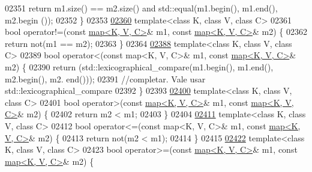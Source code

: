\begin{DoxyCode}
02351     \textcolor{keywordflow}{return} m1.size() == m2.size() and std::equal(m1.begin(), m1.end(), m2.begin
      ());
02352 \}
02353 
\hypertarget{map3_8h_source_l02360}{}\hyperlink{classaed2_1_1map_abce0fa35c5b25fd67111c2e704616f09_abce0fa35c5b25fd67111c2e704616f09}{02360} \textcolor{keyword}{template}<\textcolor{keyword}{class} K, \textcolor{keyword}{class} V, \textcolor{keyword}{class} C>
02361 \textcolor{keywordtype}{bool} operator!=(\textcolor{keyword}{const} \hyperlink{classaed2_1_1map}{map<K, V, C>}& m1, \textcolor{keyword}{const} \hyperlink{classaed2_1_1map}{map<K, V, C>}& m2) \{
02362     \textcolor{keywordflow}{return} not(m1 == m2);
02363 \}
02364 
\hypertarget{map3_8h_source_l02388}{}\hyperlink{classaed2_1_1map_a8ff07f6a24c290ea7e8f63ec7ab24f8d_a8ff07f6a24c290ea7e8f63ec7ab24f8d}{02388} \textcolor{keyword}{template}<\textcolor{keyword}{class} K, \textcolor{keyword}{class} V, \textcolor{keyword}{class} C>
02389 \textcolor{keywordtype}{bool} operator<(const map<K, V, C>& m1, \textcolor{keyword}{const} \hyperlink{classaed2_1_1map}{map<K, V, C>}& m2) \{
02390     \textcolor{keywordflow}{return} (std::lexicographical\_compare(m1.begin(), m1.end(), m2.begin(), m2.
      end()));
02391     \textcolor{comment}{//completar.  Vale usar std::lexicographical\_compare}
02392 \}
02393 
\hypertarget{map3_8h_source_l02400}{}\hyperlink{classaed2_1_1map_a2000cd874b72034ce7fe730c811b6c63_a2000cd874b72034ce7fe730c811b6c63}{02400} \textcolor{keyword}{template}<\textcolor{keyword}{class} K, \textcolor{keyword}{class} V, \textcolor{keyword}{class} C>
02401 \textcolor{keywordtype}{bool} operator>(\textcolor{keyword}{const} \hyperlink{classaed2_1_1map}{map<K, V, C>}& m1, \textcolor{keyword}{const} \hyperlink{classaed2_1_1map}{map<K, V, C>}& m2) \{
02402     \textcolor{keywordflow}{return} m2 < m1;
02403 \}
02404 
\hypertarget{map3_8h_source_l02411}{}\hyperlink{classaed2_1_1map_afe374b37f17263d0cad3ee19a590d208_afe374b37f17263d0cad3ee19a590d208}{02411} \textcolor{keyword}{template}<\textcolor{keyword}{class} K, \textcolor{keyword}{class} V, \textcolor{keyword}{class} C>
02412 \textcolor{keywordtype}{bool} operator<=(const map<K, V, C>& m1, \textcolor{keyword}{const} \hyperlink{classaed2_1_1map}{map<K, V, C>}& m2) \{
02413     \textcolor{keywordflow}{return} not(m2 < m1);
02414 \}
02415 
\hypertarget{map3_8h_source_l02422}{}\hyperlink{classaed2_1_1map_a093a6d1a055339c5fc6297a1d47a9159_a093a6d1a055339c5fc6297a1d47a9159}{02422} \textcolor{keyword}{template}<\textcolor{keyword}{class} K, \textcolor{keyword}{class} V, \textcolor{keyword}{class} C>
02423 \textcolor{keywordtype}{bool} operator>=(\textcolor{keyword}{const} \hyperlink{classaed2_1_1map}{map<K, V, C>}& m1, \textcolor{keyword}{const} \hyperlink{classaed2_1_1map}{map<K, V, C>}& m2) \{

\end{DoxyCode}
